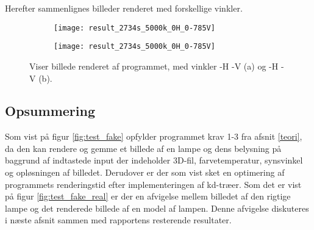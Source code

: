 Herefter sammenlignes billeder renderet med forskellige vinkler.
\begin{figure}[H]
\centering
\begin{subfigure}{.5\textwidth}
  \centering
  \texttt{[image: result\_2734s\_5000k\_0H\_0-785V]}
  \caption{}
  \label{fig:real}
\end{subfigure}%
\begin{subfigure}{.5\textwidth}
  \centering
  \texttt{[image: result\_2734s\_5000k\_0H\_0-785V]}
  \caption{}
  \label{fig:fake}
\end{subfigure}
\caption{Viser billede renderet af programmet, med vinkler -H -V (a) og -H -V (b).}
\label{fig:test_real_fake}
\end{figure}

\subsection*{Opsummering}
Som vist på figur \ref{fig:test_fake} opfylder programmet krav 1-3 fra afsnit \ref{teori}, da den kan rendere og gemme et billede af en lampe og dens belysning på baggrund af indtastede input der indeholder 3D-fil, farvetemperatur, synsvinkel og opløsningen af billedet. Derudover er der som vist sket en optimering af programmets renderingstid efter implementeringen af kd-træer. 
Som det er vist på figur \ref{fig:test_fake_real} er der en afvigelse mellem billedet af den rigtige lampe og det renderede billede af en model af lampen. Denne afvigelse diskuteres i næste afsnit sammen med rapportens resterende resultater. 

